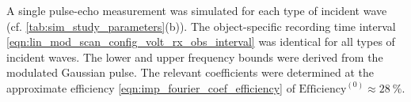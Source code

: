 A single pulse-echo measurement was simulated for
each type of
incident wave
(cf. \cref{tab:sim_study_parameters}(b)).
The object-specific recording time interval
\eqref{eqn:lin_mod_scan_config_volt_rx_obs_interval} was identical for
all types of
incident waves.
The lower and
upper frequency bounds were derived from
the modulated Gaussian pulse.
The relevant  coefficients were determined at
the approximate efficiency
\eqref{eqn:imp_fourier_coef_efficiency} of
$\text{Efficiency}^{(0)} \approx \SI{28}{\percent}$.
